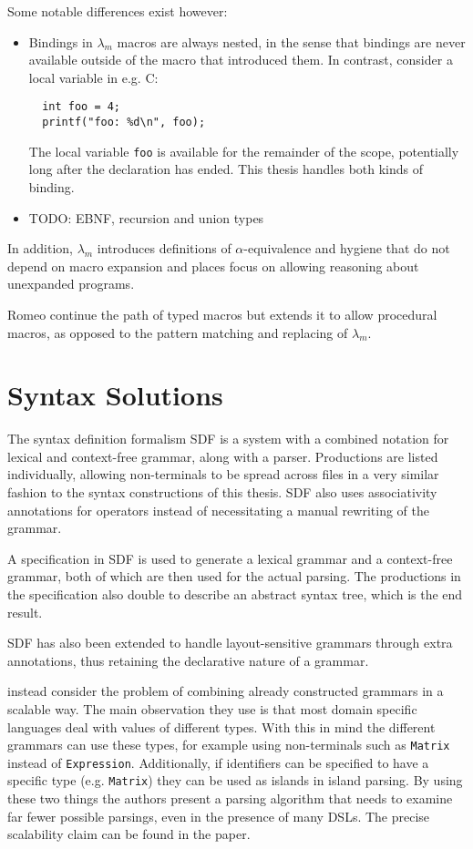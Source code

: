 \documentclass{kththesis}
\begin{document}
Some notable differences exist however:
\begin{itemize}
  \item Bindings in $\lambda_m$ macros are always nested, in the sense that bindings are never available outside of the macro that introduced them. In contrast, consider a local variable in e.g. C:
  \begin{verbatim}
  int foo = 4;
  printf("foo: %d\n", foo);
  \end{verbatim}
  The local variable \texttt{foo} is available for the remainder of the scope, potentially long after the declaration has ended. This thesis handles both kinds of binding.
  \item TODO: EBNF, recursion and union types
\end{itemize}

In addition, $\lambda_m$ introduces definitions of $\alpha$-equivalence and hygiene that do not depend on macro expansion and places focus on allowing reasoning about unexpanded programs.

Romeo \cite{Stansifer2014Romeo} continue the path of typed macros but extends it to allow procedural macros, as opposed to the pattern matching and replacing of $\lambda_m$.

\section{Syntax Solutions} \label{sec:syntax-solutions}

The syntax definition formalism SDF \cite{Heering1989The-syntax-defi} is a system with a combined notation for lexical and context-free grammar, along with a parser. Productions are listed individually, allowing non-terminals to be spread across files in a very similar fashion to the syntax constructions of this thesis. SDF also uses associativity annotations for operators instead of necessitating a manual rewriting of the grammar.

A specification in SDF is used to generate a lexical grammar and a context-free grammar, both of which are then used for the actual parsing. The productions in the specification also double to describe an abstract syntax tree, which is the end result.

SDF has also been extended to handle layout-sensitive grammars \cite{Erdweg2013Layout-sensitiv} through extra annotations, thus retaining the declarative nature of a grammar.

\textcite{Silkensen2013Well-Typed-Isla} instead consider the problem of combining already constructed grammars in a scalable way. The main observation they use is that most domain specific languages deal with values of different types. With this in mind the different grammars can use these types, for example using non-terminals such as \texttt{Matrix} instead of \texttt{Expression}. Additionally, if identifiers can be specified to have a specific type (e.g. \texttt{Matrix}) they can be used as islands in island parsing. By using these two things the authors present a parsing algorithm that needs to examine far fewer possible parsings, even in the presence of many DSLs. The precise scalability claim can be found in the paper.
\end{document}
